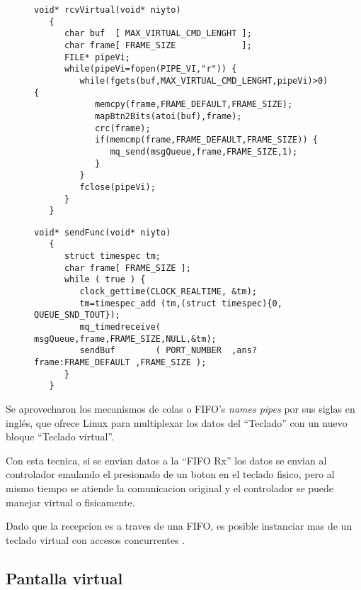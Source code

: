\begin{figure}
   \begin{lstlisting}[label={cod:handheld1},caption={},title={\lstlistingname~\thelstlisting:Tarea que recibe datos del teclado virtual y los reenvia a la cola de multiplexado..}]
   void* rcvVirtual(void* niyto)
   {
      char buf  [ MAX_VIRTUAL_CMD_LENGHT ];
      char frame[ FRAME_SIZE             ];
      FILE* pipeVi;
      while(pipeVi=fopen(PIPE_VI,"r")) {
         while(fgets(buf,MAX_VIRTUAL_CMD_LENGHT,pipeVi)>0) {
            memcpy(frame,FRAME_DEFAULT,FRAME_SIZE);
            mapBtn2Bits(atoi(buf),frame);
            crc(frame);
            if(memcmp(frame,FRAME_DEFAULT,FRAME_SIZE)) {
               mq_send(msgQueue,frame,FRAME_SIZE,1);
            }
         }
         fclose(pipeVi);
      }
   }
   \end{lstlisting}
\end{figure}

\begin{figure}
   \begin{lstlisting}[label={cod:handheld1},caption={},title={\lstlistingname~\thelstlisting:Taread de multiplexado de los datos del teclado fisico y virtual.}]
   void* sendFunc(void* niyto)
   {
      struct timespec tm;
      char frame[ FRAME_SIZE ];
      while ( true ) {
         clock_gettime(CLOCK_REALTIME, &tm);
         tm=timespec_add (tm,(struct timespec){0, QUEUE_SND_TOUT});
         mq_timedreceive( msgQueue,frame,FRAME_SIZE,NULL,&tm);
         sendBuf        ( PORT_NUMBER  ,ans?frame:FRAME_DEFAULT ,FRAME_SIZE );
      }
   }
   \end{lstlisting}
\end{figure}

   Se aprovecharon los mecanismos de colas o FIFO's \textit{names pipes} por sus siglas en inglés, que ofrece Linux para multiplexar los datos del ``Teclado'' con un nuevo bloque ``Teclado virtual''.\par
      Con esta tecnica, si se envian datos a la ``FIFO Rx'' los datos se envian al controlador emulando el presionado de un boton en el teclado fisico, pero al mismo tiempo se atiende la comunicacion original y el controlador se puede manejar virtual o fisicamente.\par
   Dado que la recepcion es a traves de una FIFO, es posible instanciar mas de un teclado virtual con accesos concurrentes \citep{book:embeddedprimer}.

\subsection{Pantalla virtual}

